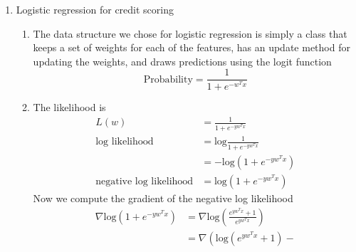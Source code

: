 \documentclass{article}
\begin{document}
\begin{enumerate}
\begin{enumerate}
\begin{equation*}
                  \exp(-\beta_i\lambda_i)\right) d\lambda_{i,class}
                \end{equation*}
                We train across email samples to find the relevant \(\alpha_i,\beta_i\) by
                \begin{algorithmic}
                   (x, y=class):
                    :
                      \(\alpha_{i,y}\) \gets \(\alpha_{i,y}\) + 1
                      \(\geta_{i,y}\) \gets \(\beta_{i,y}\) + x_i
                    \ENDFOR
                  \ENDFOR
                \end{algorithmic}      
            \item %
        \end{enumerate}
    \item Logistic regression for credit scoring %
        \begin{enumerate}
            \item %
                The data structure we chose for logistic regression is
                simply a class that keeps a set of weights for each of the
                features, has an update method for updating the weights,
                and draws predictions using the logit function
                \begin{equation*}
                    \text{Probability} = \frac{1}{1 + e^{-w^Tx}}
                \end{equation*}
            \item %
                The likelihood is
                \begin{align*}
                    L(w) 
                        &= \frac{1}{1 + e^{-yw^Tx}} \\
                    \text{log likelihood} 
                        &= \text{log}\frac{1}{1 + e^{-yw^Tx}} \\
                        &= -\text{log} (1 + e^{-yw^Tx}) \\
                    \text{negative log likelihood}
                        &= \text{log} (1 + e^{-yw^Tx})
                \end{align*}
                Now we compute the gradient of the negative log likelihood
                \begin{align*}
                    \nabla \text{log} (1 + e^{-yw^Tx})
                        &= \nabla \text{log} \left( \frac{e^{yw^Tx} + 1}
                            {e^{yw^Tx}} \right) \\
                        &= \nabla \left( \text{log}(e^{yw^Tx} + 1) -

\end{align*}
\end{enumerate}
\end{enumerate}
\end{document}

